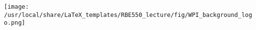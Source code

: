 
\begin{frame}[label=finalframe]
 

\begin{center}
\texttt{[image: /usr/local/share/LaTeX\_templates/RBE550\_lecture/fig/WPI\_background\_logo.png]}
\end{center}

\end{frame}

 


